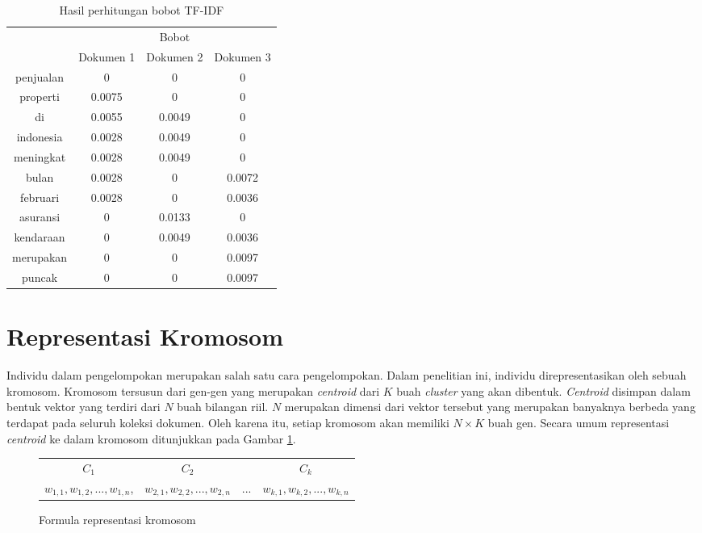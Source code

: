 \begin{table}[H]
	\centering
	\begin{tabular}{|c|c|c|c|} \hline
		\multirow{2}{*}{\Term} & \multicolumn{3}{c|}{Bobot} \\ \cline{2-4}
		& Dokumen 1 & Dokumen 2 & Dokumen 3 \\ \hline 
        penjualan & 0 & 0 & 0 \\ \hline
        properti & 0.0075 & 0 & 0 \\ \hline
        di & 0.0055 & 0.0049 & 0 \\ \hline
        indonesia & 0.0028 & 0.0049 & 0 \\ \hline
        meningkat & 0.0028 & 0.0049 & 0 \\ \hline
        bulan & 0.0028 & 0 & 0.0072 \\ \hline
        februari & 0.0028 & 0 & 0.0036 \\ \hline
        asuransi & 0 & 0.0133 & 0 \\ \hline
        kendaraan & 0 & 0.0049 & 0.0036 \\ \hline
        merupakan & 0 & 0 & 0.0097 \\ \hline
        puncak & 0 & 0 & 0.0097 \\ \hline
	\end{tabular}
	\caption{Hasil perhitungan bobot TF-IDF}
	\label{tbl:tf-idf}
\end{table}

\section{Representasi Kromosom}
\label{sec:chromosome-rep}
Individu dalam pengelompokan merupakan salah satu cara pengelompokan. Dalam penelitian ini, individu direpresentasikan oleh sebuah kromosom. Kromosom tersusun dari gen-gen yang merupakan \textit{centroid} dari $K$ buah \textit{cluster} yang akan dibentuk. \textit{Centroid} disimpan dalam bentuk vektor yang terdiri dari $N$ buah bilangan riil. $N$ merupakan dimensi dari vektor tersebut yang merupakan banyaknya \term berbeda yang terdapat pada seluruh koleksi dokumen. Oleh karena itu, setiap kromosom akan memiliki $N\times K$ buah gen. Secara umum representasi \textit{centroid} ke dalam kromosom ditunjukkan pada Gambar \ref{fig:chromosome-rep}.

\begin{figure}[H]
	\centering
	\begin{tabular}{c c c c}
		$C_1$ & $C_2$ & & $C_k$ \\
		$w_{1,1}, w_{1,2}, ..., w_{1,n}$, & $w_{2,1}, w_{2,2}, ..., w_{2,n}$ & ... & $w_{k,1}, w_{k,2}, ..., w_{k,n}$
	\end{tabular}
	\caption{Formula representasi kromosom}
	\label{fig:chromosome-rep}
\end{figure}

